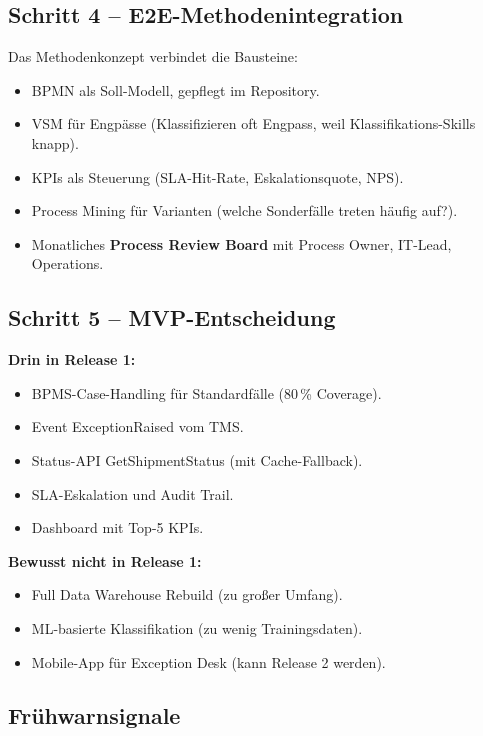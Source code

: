 \documentclass[11pt,a4paper,oneside]{article}
\newcommand{\fachbegriff}[1]{\textbf{#1}}
\begin{document}
\subsection{Schritt 4 -- E2E-Methodenintegration}

Das Methodenkonzept verbindet die Bausteine:

\begin{itemize}
  \item BPMN als Soll-Modell, gepflegt im Repository.
  \item VSM für Engpässe (Klassifizieren oft Engpass, weil Klassifikations-Skills knapp).
  \item KPIs als Steuerung (SLA-Hit-Rate, Eskalationsquote, NPS).
  \item Process Mining für Varianten (welche Sonderfälle treten häufig auf?).
  \item Monatliches \fachbegriff{Process Review Board} mit Process Owner, IT-Lead, Operations.
\end{itemize}

\subsection{Schritt 5 -- MVP-Entscheidung}

\textbf{Drin in Release 1:}
\begin{itemize}
  \item BPMS-Case-Handling für Standardfälle (80\,\% Coverage).
  \item Event ExceptionRaised vom TMS.
  \item Status-API GetShipmentStatus (mit Cache-Fallback).
  \item SLA-Eskalation und Audit Trail.
  \item Dashboard mit Top-5 KPIs.
\end{itemize}

\textbf{Bewusst nicht in Release 1:}
\begin{itemize}
  \item Full Data Warehouse Rebuild (zu großer Umfang).
  \item ML-basierte Klassifikation (zu wenig Trainingsdaten).
  \item Mobile-App für Exception Desk (kann Release 2 werden).
\end{itemize}

\subsection{Frühwarnsignale}
\end{document}
